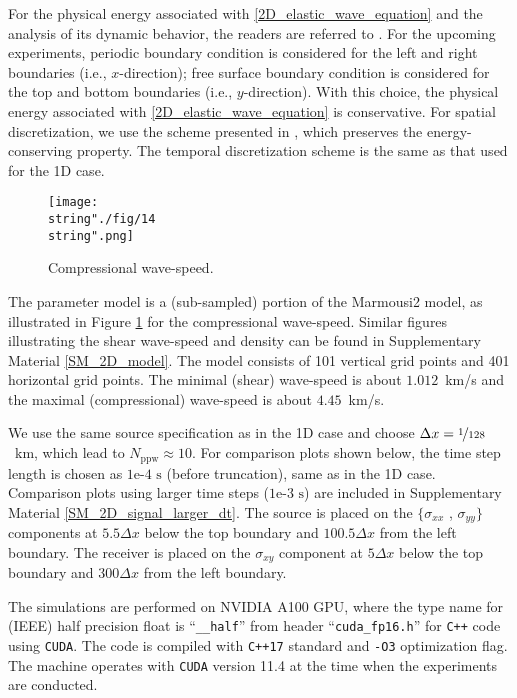 \documentclass[10pt]{article}
\def\ppw{\text{ppw}}
\begin{document}
For the physical energy associated with \eqref{2D_elastic_wave_equation} and the analysis of its dynamic behavior, the readers are referred to \cite{gao2020simultaneous,gao2019combining}.
%
For the upcoming experiments, periodic boundary condition is considered for the left and right boundaries (i.e., $x$-direction); free surface boundary condition is considered for the top and bottom boundaries (i.e., $y$-direction).
%
With this choice, the physical energy associated with \eqref{2D_elastic_wave_equation} is conservative.
%
For spatial discretization, we use the scheme presented in \cite{gao2020simultaneous}, which preserves the energy-conserving property. 
%
The temporal discretization scheme is the same as that used for the 1D case.


\begin{figure}[H]
\captionsetup{width=1\textwidth, font=footnotesize,labelfont=footnotesize}
\centering\texttt{[image: \\string"./fig/14\\string".png]}
%
\vspace{-1em}
\caption{Compressional wave-speed.}
\label{model_vp}
\end{figure}


The parameter model is a (sub-sampled) portion of the Marmousi2 model, as illustrated in Figure \ref{model_vp} for the compressional wave-speed.
%
Similar figures illustrating the shear wave-speed and density can be found in Supplementary Material \ref{SM_2D_model}.
%
The model consists of 101 vertical grid points and 401 horizontal grid points. 
%
The minimal (shear) wave-speed is about $1.012$~km/s and the maximal (compressional) wave-speed is about $4.45$~km/s.
%


We use the same source specification as in the 1D case and choose $\Delta x = \nicefrac{1}{128}$~km, which lead to $N_\ppw \approx 10$. 
%
For comparison plots shown below, the time step length is chosen as $1\text{e-4~s}$ (before truncation), same as in the 1D case.
%
Comparison plots using larger time steps ($1\text{e-3~s}$) are included in Supplementary Material \ref{SM_2D_signal_larger_dt}.
%
The source is placed on the $\{\sigma_{xx}$ , $\sigma_{yy}\}$ components at $5.5\Delta x$ below the top boundary and $100.5\Delta x$ from the left boundary.
%
The receiver is placed on the $\sigma_{xy}$ component at $5 \Delta x$ below the top boundary and $300 \Delta x$ from the left boundary.

The simulations are performed on NVIDIA A100 GPU, where the type name for (IEEE) half precision float is ``\texttt{\_\_half}'' from header ``\texttt{cuda\_fp16.h}'' for \texttt{C++} code using \texttt{CUDA}.
%
The code is compiled with \texttt{C++17} standard and \texttt{-O3} optimization flag.
%
The machine operates with \texttt{CUDA} version 11.4 at the time when the experiments are conducted.
\end{document}

